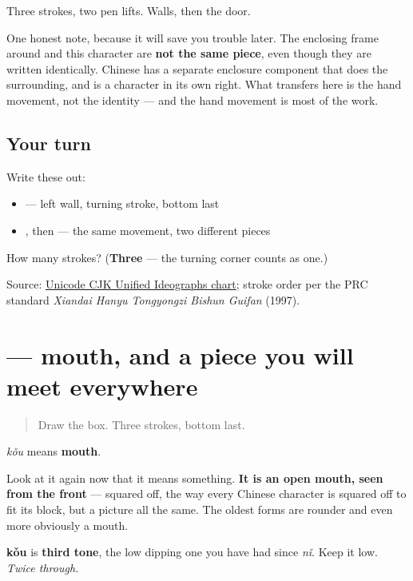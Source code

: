 Three strokes, two pen lifts. Walls, then the door.

One honest note, because it will save you trouble later. The enclosing frame around  and this character are \textbf{not the same piece}, even though they are written identically. Chinese has a separate enclosure component that does the surrounding, and  is a character in its own right. What transfers here is the hand movement, not the identity — and the hand movement is most of the work.

\subsection*{Your turn}
Write these out:

\begin{itemize}
\raggedright
  \item {} — left wall, turning stroke, bottom last
  \item {}, then  — the same movement, two different pieces
\end{itemize}

\begin{tcolorbox}[breakable,colback=teal!4,colframe=teal!35!black,title={Before you move on}]
How many strokes? (\textbf{Three} — the turning corner counts as one.)

Source: \href{https://www.unicode.org/charts/PDF/U4E00.pdf}{Unicode CJK Unified Ideographs chart}; stroke order per the PRC standard \emph{Xiandai Hanyu Tongyongzi Bishun Guifan} (1997).
\end{tcolorbox}
\section[\texorpdfstring{\zh{口} (kǒu)}{口 (kǒu)}]{ — mouth, and a piece you will meet everywhere}

\label{lesson:ZH-C04-kou}



\begin{quote}
Draw the box. Three strokes, bottom last.
\end{quote}

\begin{sounds}
\textbf{} \emph{kǒu} means \textbf{mouth}.

Look at it again now that it means something. \textbf{It is an open mouth, seen from the front} — squared off, the way every Chinese character is squared off to fit its block, but a picture all the same. The oldest forms are rounder and even more obviously a mouth.

\textbf{kǒu} is \textbf{third tone}, the low dipping one you have had since \emph{nǐ}. Keep it low. \emph{Twice through.}
\end{sounds}

